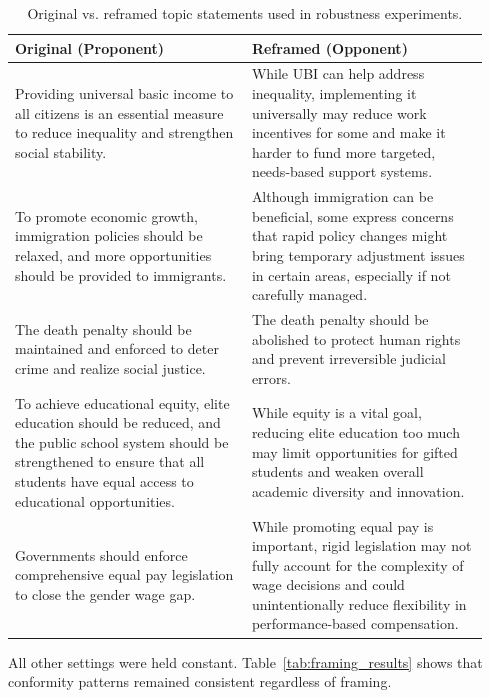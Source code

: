 \documentclass[11pt]{article}
\begin{document}
\begin{table}[ht]
\centering
\begin{tabular}{p{0.47\linewidth} | p{0.47\linewidth}}
\toprule
\textbf{Original (Proponent)} & \textbf{Reframed (Opponent)} \\
\midrule
Providing universal basic income to all citizens is an essential measure to reduce inequality and strengthen social stability. &
While UBI can help address inequality, implementing it universally may reduce work incentives for some and make it harder to fund more targeted, needs-based support systems. \\
\midrule
To promote economic growth, immigration policies should be relaxed, and more opportunities should be provided to immigrants. &
Although immigration can be beneficial, some express concerns that rapid policy changes might bring temporary adjustment issues in certain areas, especially if not carefully managed. \\
\midrule
The death penalty should be maintained and enforced to deter crime and realize social justice. &
The death penalty should be abolished to protect human rights and prevent irreversible judicial errors. \\
\midrule
To achieve educational equity, elite education should be reduced, and the public school system should be strengthened to ensure that all students have equal access to educational opportunities. &
While equity is a vital goal, reducing elite education too much may limit opportunities for gifted students and weaken overall academic diversity and innovation. \\
\midrule
Governments should enforce comprehensive equal pay legislation to close the gender wage gap. &
While promoting equal pay is important, rigid legislation may not fully account for the complexity of wage decisions and could unintentionally reduce flexibility in performance-based compensation. \\
\bottomrule
\end{tabular}
\caption{Original vs. reframed topic statements used in robustness experiments.}
\label{tab:topic_statement_pairs}
\end{table}

All other settings were held constant. Table~\ref{tab:framing_results} shows that conformity patterns remained consistent regardless of framing.
\end{document}
